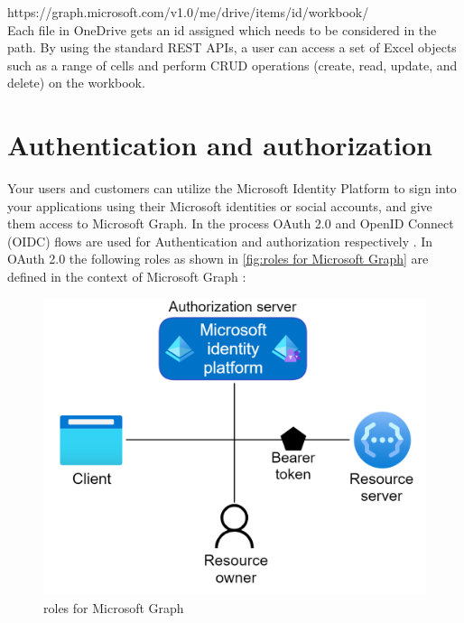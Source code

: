 https://graph.microsoft.com/v1.0/me/drive/items/{id}/workbook/  
\\[0.5cm]
Each file in OneDrive gets an id assigned which needs to be considered in the path. By using the standard REST APIs, a user can access a set of Excel objects such as a range of cells and perform CRUD operations (create, read, update, and delete) on the workbook. 



\section{Authentication and authorization}

Your users and customers can utilize the Microsoft Identity Platform to sign into your applications using their Microsoft identities or social accounts, and give them access to Microsoft Graph. In the process OAuth 2.0 and OpenID Connect (OIDC) flows are used for Authentication and authorization respectively \cite{MSIDP}. In OAuth 2.0 the following roles as shown in \ref{fig:roles for Microsoft Graph} are defined in the context of Microsoft Graph \cite{MSOAuthOIDr}:

\begin{figure}[h!]
  \includegraphics[scale=0.9]{Figures/OAuth roles.png}
  \caption{roles for Microsoft Graph}
  \label{OAuth 2.0 roles for Microsoft Graph}
\end{figure}

